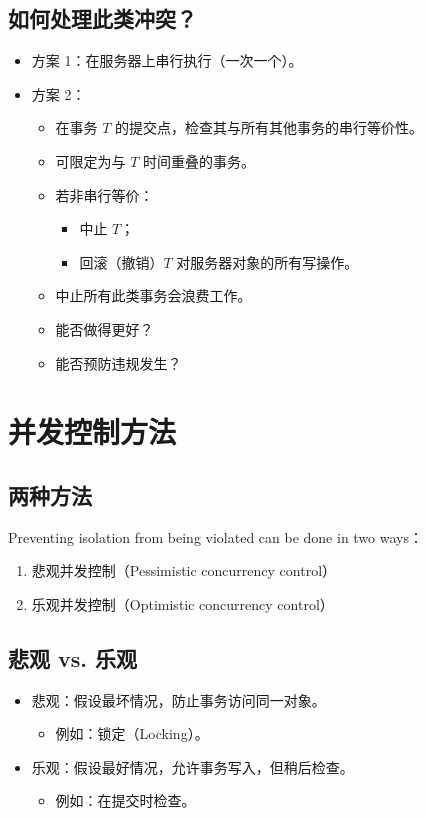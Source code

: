 \documentclass[UTF8,a4paper,11pt]{ctexart}
\begin{document}
\subsection{如何处理此类冲突？}

\begin{itemize}
  \item 方案 1：在服务器上串行执行（一次一个）。
  \item 方案 2：
  \begin{itemize}
    \item 在事务 $T$ 的提交点，检查其与所有其他事务的串行等价性。
    \item 可限定为与 $T$ 时间重叠的事务。
    \item 若非串行等价：
    \begin{itemize}
      \item 中止 $T$；
      \item 回滚（撤销）$T$ 对服务器对象的所有写操作。
    \end{itemize}
    \item 中止所有此类事务会浪费工作。
    \item 能否做得更好？
    \item 能否预防违规发生？
  \end{itemize}
\end{itemize}

\section{并发控制方法}

\subsection{两种方法}

Preventing isolation from being violated can be done in two ways：

\begin{enumerate}
  \item 悲观并发控制（Pessimistic concurrency control）
  \item 乐观并发控制（Optimistic concurrency control）
\end{enumerate}

\subsection{悲观 vs. 乐观}

\begin{itemize}
  \item 悲观：假设最坏情况，防止事务访问同一对象。
  \begin{itemize}
    \item 例如：锁定（Locking）。
  \end{itemize}
  \item 乐观：假设最好情况，允许事务写入，但稍后检查。
  \begin{itemize}
    \item 例如：在提交时检查。
  \end{itemize}
\end{itemize}
\end{document}
